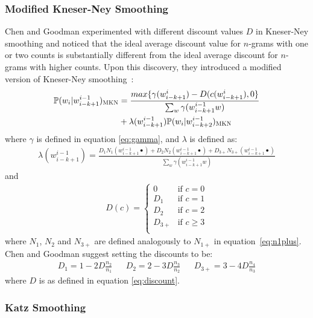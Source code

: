 \documentclass[a4paper, 12pt]{report}
\begin{document}
\subsubsection{Modified Kneser-Ney Smoothing}

Chen and Goodman experimented with different discount values $D$ in Kneser-Ney smoothing and noticed that the ideal average discount value for $n$-grams with one or two counts is substantially different from the ideal average discount for $n$-grams with higher counts. Upon this discovery, they introduced a modified version of Kneser-Ney smoothing~\cite{modified_kneser_ney:chen1999}:
\begin{equation}
\begin{aligned}
	\mathbb{P}(w_i | w_{i - k + 1}^{i - 1})_{\text{\scshape MKN}} &= \frac{max\{\gamma(w_{i - k + 1}^{i}) - D(c(w_{i - k + 1}^{i}), 0\}}{\sum_w \gamma(w_{i - k + 1}^{i - 1}w)} \\
	&+ \lambda(w_{i - k + 1}^{i - 1})\mathbb{P}(w_i | w_{i - k + 2}^{i - 1})_{\text{\scshape MKN}}
\end{aligned}
\end{equation}
where $\gamma$ is defined in equation \ref{eq:gamma}, and $\lambda$ is defined as:
\begin{gather}
	\lambda(w_{i - k + 1}^{i - 1}) = \frac{D_1N_1(w_{i - k + 1}^{i - 1}\bullet) + D_2N_2(w_{i - k + 1}^{i - 1}\bullet) + D_{3+}N_{3+}(w_{i - k + 1}^{i - 1}\bullet)}{\sum_w \gamma(w_{i - k + 1}^{i - 1}w)}
\end{gather}
and
\begin{gather}
	D(c) = \begin{cases}
		0 &\text{if }c = 0 \\
		D_1 &\text{if }c = 1 \\
		D_2 &\text{if }c = 2 \\
		D_{3+} &\text{if }c \geq 3 \\
	\end{cases}
\end{gather}
where $N_1$, $N_2$ and $N_{3+}$ are defined analogously to $N_{1+}$ in equation~\ref{eq:n1plus}. Chen and Goodman suggest setting the discounts to be:
\begin{align}
	D_1 = 1 - 2D\frac{n_2}{n_1} && D_2 = 2 - 3D\frac{n_3}{n_2} && D_{3+} = 3 - 4D\frac{n_4}{n_3}
\end{align}
where $D$ is as defined in equation \ref{eq:discount}.

\subsubsection{Katz Smoothing}
\end{document}
